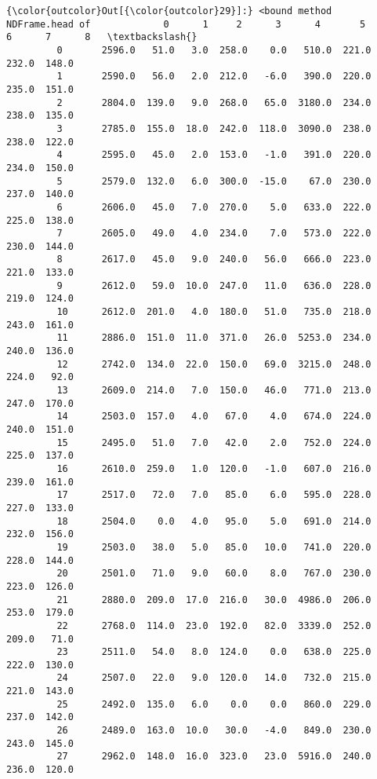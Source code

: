 \documentclass[11pt]{article}
\begin{document}
            \begin{Verbatim}[commandchars=\\\{\}]
{\color{outcolor}Out[{\color{outcolor}29}]:} <bound method NDFrame.head of             0      1     2      3      4       5      6      7      8   \textbackslash{}
         0       2596.0   51.0   3.0  258.0    0.0   510.0  221.0  232.0  148.0   
         1       2590.0   56.0   2.0  212.0   -6.0   390.0  220.0  235.0  151.0   
         2       2804.0  139.0   9.0  268.0   65.0  3180.0  234.0  238.0  135.0   
         3       2785.0  155.0  18.0  242.0  118.0  3090.0  238.0  238.0  122.0   
         4       2595.0   45.0   2.0  153.0   -1.0   391.0  220.0  234.0  150.0   
         5       2579.0  132.0   6.0  300.0  -15.0    67.0  230.0  237.0  140.0   
         6       2606.0   45.0   7.0  270.0    5.0   633.0  222.0  225.0  138.0   
         7       2605.0   49.0   4.0  234.0    7.0   573.0  222.0  230.0  144.0   
         8       2617.0   45.0   9.0  240.0   56.0   666.0  223.0  221.0  133.0   
         9       2612.0   59.0  10.0  247.0   11.0   636.0  228.0  219.0  124.0   
         10      2612.0  201.0   4.0  180.0   51.0   735.0  218.0  243.0  161.0   
         11      2886.0  151.0  11.0  371.0   26.0  5253.0  234.0  240.0  136.0   
         12      2742.0  134.0  22.0  150.0   69.0  3215.0  248.0  224.0   92.0   
         13      2609.0  214.0   7.0  150.0   46.0   771.0  213.0  247.0  170.0   
         14      2503.0  157.0   4.0   67.0    4.0   674.0  224.0  240.0  151.0   
         15      2495.0   51.0   7.0   42.0    2.0   752.0  224.0  225.0  137.0   
         16      2610.0  259.0   1.0  120.0   -1.0   607.0  216.0  239.0  161.0   
         17      2517.0   72.0   7.0   85.0    6.0   595.0  228.0  227.0  133.0   
         18      2504.0    0.0   4.0   95.0    5.0   691.0  214.0  232.0  156.0   
         19      2503.0   38.0   5.0   85.0   10.0   741.0  220.0  228.0  144.0   
         20      2501.0   71.0   9.0   60.0    8.0   767.0  230.0  223.0  126.0   
         21      2880.0  209.0  17.0  216.0   30.0  4986.0  206.0  253.0  179.0   
         22      2768.0  114.0  23.0  192.0   82.0  3339.0  252.0  209.0   71.0   
         23      2511.0   54.0   8.0  124.0    0.0   638.0  225.0  222.0  130.0   
         24      2507.0   22.0   9.0  120.0   14.0   732.0  215.0  221.0  143.0   
         25      2492.0  135.0   6.0    0.0    0.0   860.0  229.0  237.0  142.0   
         26      2489.0  163.0  10.0   30.0   -4.0   849.0  230.0  243.0  145.0   
         27      2962.0  148.0  16.0  323.0   23.0  5916.0  240.0  236.0  120.0   

\end{Verbatim}
\end{document}
